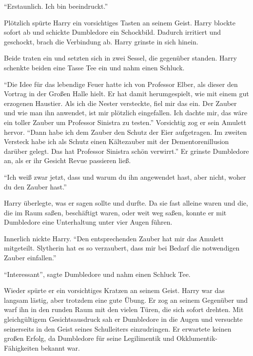 \enquote{Erstaunlich. Ich bin beeindruckt.}

Plötzlich spürte Harry ein vorsichtiges Tasten an seinem Geist. Harry blockte sofort ab und schickte Dumbledore ein Schockbild. Dadurch irritiert und geschockt, brach die Verbindung ab. Harry grinste in sich hinein.

Beide traten ein und setzten sich in zwei Sessel, die gegenüber standen. Harry schenkte beiden eine Tasse Tee ein und nahm einen Schluck.

\enquote{Die Idee für das lebendige Feuer hatte ich von Professor Elber, als dieser den Vortrag in der Großen Halle hielt. Er hat damit herumgespielt, wie mit einem gut erzogenen Haustier. Als ich die Nester versteckte, fiel mir das ein. Der Zauber und wie man ihn anwendet, ist mir plötzlich eingefallen. Ich dachte mir, das wäre ein toller Zauber um Professor Sinistra zu testen.} Vorsichtig zog er sein Amulett hervor. \enquote{Dann habe ich dem Zauber den Schutz der Eier aufgetragen. Im zweiten Versteck habe ich als Schutz einen Kältezauber mit der Dementorenillusion darüber gelegt. Das hat Professor Sinistra schön verwirrt.} Er grinste Dumbledore an, als er ihr Gesicht Revue passieren ließ.

\enquote{Ich weiß zwar jetzt, dass und warum du ihn angewendet hast, aber nicht, woher du den Zauber hast.}

Harry überlegte, was er sagen sollte und durfte. Da sie fast alleine waren und die, die im Raum saßen, beschäftigt waren, oder weit weg saßen, konnte er mit Dumbledore eine Unterhaltung unter vier Augen führen.


Innerlich nickte Harry. \enquote{Den entsprechenden Zauber hat mir das Amulett mitgeteilt. Slytherin hat es so verzaubert, dass mir bei Bedarf die notwendigen Zauber einfallen.}

\enquote{Interessant}, sagte Dumbledore und nahm einen Schluck Tee.

Wieder spürte er ein vorsichtiges Kratzen an seinem Geist. Harry war das langsam lästig, aber trotzdem eine gute Übung. Er zog an seinem Gegenüber und warf ihn in den runden Raum mit den vielen Türen, die sich sofort drehten. Mit gleichgültigem Gesichtsausdruck sah er Dumbledore in die Augen und versuchte seinerseits in den Geist seines Schulleiters einzudringen. Er erwartete keinen großen Erfolg, da Dumbledore für seine Legilimentik und Okklumentik-Fähigkeiten bekannt war.

